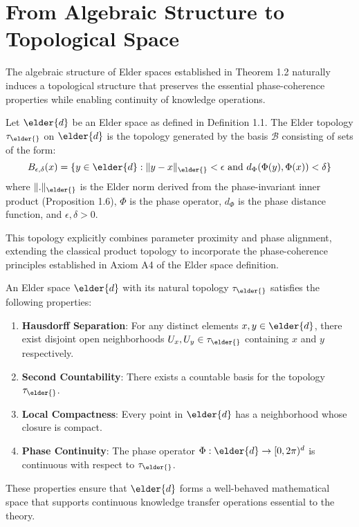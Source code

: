 \section{From Algebraic Structure to Topological Space}

The algebraic structure of Elder spaces established in Theorem 1.2 naturally induces a topological structure that preserves the essential phase-coherence properties while enabling continuity of knowledge operations.

\begin{definition}
Let $\elder{d}$ be an Elder space as defined in Definition 1.1. The Elder topology $\tau_{\elder{}}$ on $\elder{d}$ is the topology generated by the basis $\mathcal{B}$ consisting of sets of the form:
\begin{equation}
B_{\epsilon, \delta}(x) = \{y \in \elder{d} : \|y - x\|_{\elder{}} < \epsilon \text{ and } d_{\Phi}(\Phi(y), \Phi(x)) < \delta\}
\end{equation}
where $\|.\|_{\elder{}}$ is the Elder norm derived from the phase-invariant inner product (Proposition 1.6), $\Phi$ is the phase operator, $d_{\Phi}$ is the phase distance function, and $\epsilon, \delta > 0$.
\end{definition}

\begin{remark}
This topology explicitly combines parameter proximity and phase alignment, extending the classical product topology to incorporate the phase-coherence principles established in Axiom A4 of the Elder space definition.
\end{remark}

\begin{theorem}
An Elder space $\elder{d}$ with its natural topology $\tau_{\elder{}}$ satisfies the following properties:
\begin{enumerate}
    \item \textbf{Hausdorff Separation}: For any distinct elements $x, y \in \elder{d}$, there exist disjoint open neighborhoods $U_x, U_y \in \tau_{\elder{}}$ containing $x$ and $y$ respectively.
    
    \item \textbf{Second Countability}: There exists a countable basis for the topology $\tau_{\elder{}}$.
    
    \item \textbf{Local Compactness}: Every point in $\elder{d}$ has a neighborhood whose closure is compact.
    
    \item \textbf{Phase Continuity}: The phase operator $\Phi: \elder{d} \rightarrow [0, 2\pi)^d$ is continuous with respect to $\tau_{\elder{}}$.
\end{enumerate}
These properties ensure that $\elder{d}$ forms a well-behaved mathematical space that supports continuous knowledge transfer operations essential to the theory.
\end{theorem}

